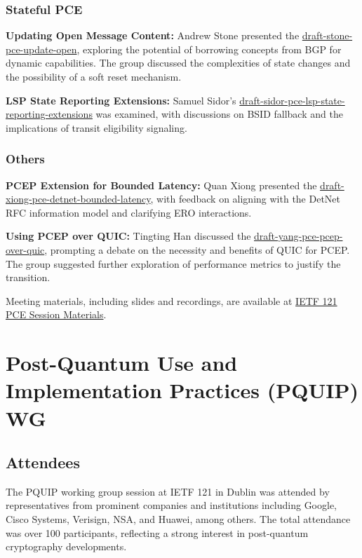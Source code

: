 \documentclass{article}
\begin{document}
\subsubsection{Stateful PCE}
\textbf{Updating Open Message Content:} Andrew Stone presented the \href{https://datatracker.ietf.org/doc/html/draft-stone-pce-update-open}{draft-stone-pce-update-open}, exploring the potential of borrowing concepts from BGP for dynamic capabilities. The group discussed the complexities of state changes and the possibility of a soft reset mechanism.

\textbf{LSP State Reporting Extensions:} Samuel Sidor's \href{https://datatracker.ietf.org/doc/html/draft-sidor-pce-lsp-state-reporting-extensions}{draft-sidor-pce-lsp-state-reporting-extensions} was examined, with discussions on BSID fallback and the implications of transit eligibility signaling.

\subsubsection{Others}
\textbf{PCEP Extension for Bounded Latency:} Quan Xiong presented the \href{https://datatracker.ietf.org/doc/html/draft-xiong-pce-detnet-bounded-latency}{draft-xiong-pce-detnet-bounded-latency}, with feedback on aligning with the DetNet RFC information model and clarifying ERO interactions.

\textbf{Using PCEP over QUIC:} Tingting Han discussed the \href{https://datatracker.ietf.org/doc/html/draft-yang-pce-pcep-over-quic}{draft-yang-pce-pcep-over-quic}, prompting a debate on the necessity and benefits of QUIC for PCEP. The group suggested further exploration of performance metrics to justify the transition.

Meeting materials, including slides and recordings, are available at \href{https://datatracker.ietf.org/meeting/121/session/pce}{IETF 121 PCE Session Materials}.




\newpage

\section{Post-Quantum Use and Implementation Practices (PQUIP) WG}

\subsection{Attendees}
The PQUIP working group session at IETF 121 in Dublin was attended by representatives from prominent companies and institutions including Google, Cisco Systems, Verisign, NSA, and Huawei, among others. The total attendance was over 100 participants, reflecting a strong interest in post-quantum cryptography developments.
\end{document}
